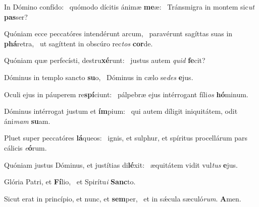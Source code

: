 \item In Dómino confído:~\pscross{} quómodo dícitis ánimæ \textbf{me}æ:~\psstar{} Tránsmigra in montem sic\textit{ut} \textbf{pas}ser?
\item Quóniam ecce peccatóres intendérunt arcum,~\pscross{} paravérunt sagíttas suas in \textbf{phá}retra,~\psstar{} ut sagíttent in obscúro rec\textit{tos} \textbf{cor}de.
\item Quóniam quæ perfecísti, destru\textbf{xé}runt:~\psstar{} justus autem \textit{quid} \textbf{fe}cit?
\item Dóminus in templo sancto \textbf{su}o,~\psstar{} Dóminus in cælo se\textit{des} \textbf{e}jus.
\item Oculi ejus in páuperem re\textbf{spí}ciunt:~\psstar{} pálpebræ ejus intérrogant fíli\textit{os} \textbf{hó}minum.
\item Dóminus intérrogat justum et \textbf{ím}pium:~\psstar{} qui autem díligit iniquitátem, odit áni\textit{mam} \textbf{su}am.
\item Pluet super peccatóres \textbf{lá}queos:~\psstar{} ignis, et sulphur, et spíritus procellárum pars cálicis \textit{e}\textbf{ó}rum.
\item Quóniam justus Dóminus, et justítias di\textbf{lé}xit:~\psstar{} æquitátem vidit vul\textit{tus} \textbf{e}jus.
\item Glória Patri, et \textbf{Fí}lio,~\psstar{} et Spirítu\textit{i} \textbf{Sanc}to.
\item Sicut erat in princípio, et nunc, et \textbf{sem}per,~\psstar{} et in sǽcula sæculó\textit{rum}. \textbf{A}men.
